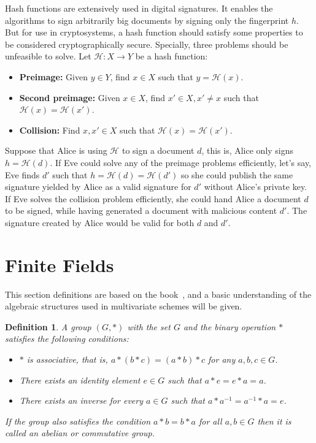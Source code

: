 \documentclass{ufsctex/ufsctex}
\newtheorem{definition}{Definition}
\begin{document}
Hash functions are extensively used in digital signatures. It enables the
algorithms to sign arbitrarily big documents by signing only the fingerprint
$h$. But for use in cryptosystems, a hash function should satisfy some
properties to be considered cryptographically secure. Specially, three problems
should be unfeasible to solve. Let $\mathcal{H}:X \rightarrow Y$ be a hash
function:

\begin{itemize}

	\item \textbf{Preimage:} Given $y \in Y$, find $x \in X$ such that $y =
		\mathcal{H}(x)$.

	\item \textbf{Second preimage:} Given $x \in X$, find $x' \in X, x' \ne x$
		such that $\mathcal{H}(x) = \mathcal{H}(x')$.

	\item \textbf{Collision:} Find $x, x' \in X$ such that $\mathcal{H}(x) =
		\mathcal{H}(x')$.

\end{itemize}

Suppose that Alice is using $\mathcal{H}$ to sign a document $d$, this is,
Alice only signs $h = \mathcal{H}(d)$. If Eve could solve any of the preimage
problems efficiently, let's say, Eve finds $d'$ such that $h = \mathcal{H}(d) =
\mathcal{H}(d')$ so she could publish the same signature yielded by Alice as a
valid signature for $d'$ without Alice's private key. If Eve solves the
collision problem efficiently, she could hand Alice a document $d$ to be
signed, while having generated a document with malicious content $d'$. The
signature created by Alice would be valid for both $d$ and $d'$.

\section{Finite Fields}

This section definitions are based on the book~\cite{lidl1983encyclopedia}, and
a basic understanding of the algebraic structures used in multivariate schemes
will be given.

\begin{definition}
A group $(G, *)$ with the set $G$ and the binary operation $*$ satisfies the
following conditions:
\begin{itemize}
	\item $*$ is associative, that is, $a*(b*c) = (a*b)*c$ for any $a, b, c \in
	G$.
	\item There exists an identity element $e \in G$ such that $a * e = e * a =
	a$.
	\item There exists an inverse for every $a \in G$ such that $a*a^{-1} =
	a^{-1}*a = e$.
\end{itemize}
If the group also satisfies the condition $a*b = b*a$ for all $a, b \in G$ then
it is called an abelian or commutative group.
\end{definition}
\end{document}
